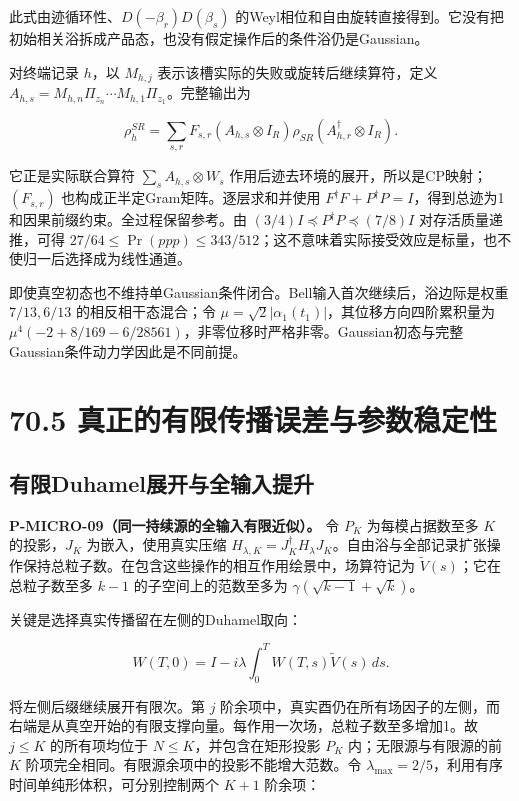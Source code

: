 \documentclass[
  11pt,
  oneside]{book}
\begin{document}
此式由迹循环性、\(D(-\beta_r)D(\beta_s)\)
的Weyl相位和自由旋转直接得到。它没有把初始相关浴拆成产品态，也没有假定操作后的条件浴仍是Gaussian。

对终端记录 \(h\)，以 \(M_{h,j}\)
表示该槽实际的失败或旋转后继续算符，定义
\(A_{h,s}=M_{h,n}\Pi_{z_n}\cdots M_{h,1}\Pi_{z_1}\)。完整输出为

\[
\rho_h^{SR}=\sum_{s,r}F_{s,r}
(A_{h,s}\otimes I_R)\rho_{SR}(A_{h,r}^\dagger\otimes I_R).
\]

它正是实际联合算符 \(\sum_sA_{h,s}\otimes W_s\)
作用后迹去环境的展开，所以是CP映射；\((F_{s,r})\)
也构成正半定Gram矩阵。逐层求和并使用
\(F^\dagger F+P^\dagger P=I\)，得到总迹为1和因果前缀约束。全过程保留参考。由
\((3/4)I\preceq P^\dagger P\preceq(7/8)I\) 对存活质量递推，可得
\(27/64\le\Pr(ppp)\le343/512\)；这不意味着实际接受效应是标量，也不使归一后选择成为线性通道。

即使真空初态也不维持单Gaussian条件闭合。Bell输入首次继续后，浴边际是权重
\(7/13,6/13\) 的相反相干态混合；令
\(\mu=\sqrt2|\alpha_1(t_1)|\)，其位移方向四阶累积量为
\(\mu^4(-2+8/169-6/28561)\)，非零位移时严格非零。Gaussian初态与完整Gaussian条件动力学因此是不同前提。

\section{70.5 真正的有限传播误差与参数稳定性}

\subsection{有限Duhamel展开与全输入提升}

\protect\hypertarget{p-micro-09}{}{}
\textbf{P-MICRO-09（同一持续源的全输入有限近似）。} 令 \(P_K\)
为每模占据数至多 \(K\) 的投影，\(J_K\) 为嵌入，使用真实压缩
\(H_{\lambda,K}=J_K^\dagger H_\lambda J_K\)。自由浴与全部记录扩张操作保持总粒子数。在包含这些操作的相互作用绘景中，场算符记为
\(\widetilde V(s)\)；它在总粒子数至多 \(k-1\) 的子空间上的范数至多为
\(\gamma(\sqrt{k-1}+\sqrt{k})\)。

关键是选择真实传播留在左侧的Duhamel取向：

\[
W(T,0)=I-i\lambda\int_0^T W(T,s)\widetilde V(s)\,ds.
\]

将左侧后缀继续展开有限次。第 \(j\)
阶余项中，真实酉仍在所有场因子的左侧，而右端是从真空开始的有限支撑向量。每作用一次场，总粒子数至多增加1。故
\(j\le K\) 的所有项均位于 \(N\le K\)，并包含在矩形投影 \(P_K\)
内；无限源与有限源的前 \(K\)
阶项完全相同。有限源余项中的投影不能增大范数。令
\(\lambda_{\max}=2/5\)，利用有序时间单纯形体积，可分别控制两个 \(K+1\)
阶余项：
\end{document}
